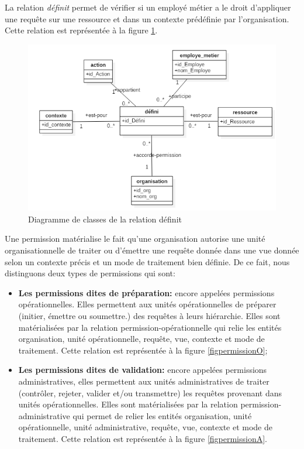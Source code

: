 \label{sectionDéfinit}

 La relation \textit{définit} permet de vérifier si un employé métier a le droit d'appliquer une requête sur une ressource et dans un contexte prédéfinie par l'organisation. Cette relation est représentée à la figure \ref{figdefini}.

\begin{figure}[h!]
    \centering
		\includegraphics[scale=0.7]{chap3/images/defini.png}
    \caption{Diagramme de classes de la relation définit}
	 \label{figdefini}
\end{figure} 

\label{sectionPermission}

Une permission matérialise le fait qu'une organisation autorise une unité organisationnelle de traiter ou d'émettre une requête donnée dans une vue donnée selon un contexte précis et un mode de traitement bien définie. De ce fait, nous distinguons deux types de permissions qui sont:
\begin{itemize}
\item \textbf{Les permissions dites de préparation:} encore appelées permissions opérationnelles. Elles permettent aux unités opérationnelles de préparer (initier, émettre ou soumettre.) des requêtes à leurs hiérarchie. Elles sont matérialisées par la relation permission-opérationnelle qui relie les entités organisation, unité opérationnelle, requête, vue, contexte et mode de traitement. Cette relation est représentée à la figure \ref{figpermissionO};
\item \textbf{Les permissions dites de validation:} encore appelées permissions administratives, elles permettent aux unités administratives de traiter (contrôler, rejeter, valider et/ou transmettre) les requêtes  provenant dans unités opérationnelles. Elles sont matérialisées par la relation permission-administrative qui permet de relier les entités organisation, unité opérationnelle, unité administrative, requête, vue, contexte et mode de traitement. Cette relation est représentée à la figure \ref{figpermissionA}.
\end{itemize}

